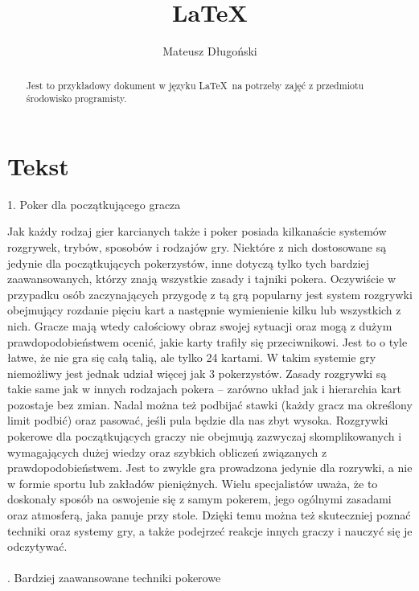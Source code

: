 \documentclass{article}
\title{\LaTeX}
\author{Mateusz Długoński}
\date{}
\begin{document}
\maketitle 

\begin{abstract}
Jest to przykładowy dokument w języku \LaTeX\ na potrzeby zajęć z przedmiotu środowisko programisty. 
\end{abstract}
\section{Tekst}\label{sec:tekst}
1. Poker dla początkującego gracza

Jak każdy rodzaj gier karcianych także i poker posiada kilkanaście systemów rozgrywek, trybów, sposobów i rodzajów gry. Niektóre z nich dostosowane są jedynie dla początkujących pokerzystów, inne dotyczą tylko tych bardziej zaawansowanych, którzy znają wszystkie zasady i tajniki pokera. Oczywiście w przypadku osób zaczynających przygodę z tą grą popularny jest system rozgrywki obejmujący rozdanie pięciu kart a następnie wymienienie kilku lub wszystkich z nich. Gracze mają wtedy całościowy obraz swojej sytuacji oraz mogą z dużym prawdopodobieństwem ocenić, jakie karty trafiły się przeciwnikowi. Jest to o tyle łatwe, że nie gra się całą talią, ale tylko 24 kartami.
W takim systemie gry niemożliwy jest jednak udział więcej jak 3 pokerzystów. Zasady rozgrywki są takie same jak w innych rodzajach pokera – zarówno układ jak i hierarchia kart pozostaje bez zmian. Nadal można też podbijać stawki (każdy gracz ma określony limit podbić) oraz pasować, jeśli pula będzie dla nas zbyt wysoka.
Rozgrywki pokerowe dla początkujących graczy nie obejmują zazwyczaj skomplikowanych i wymagających dużej wiedzy oraz szybkich obliczeń związanych z prawdopodobieństwem. Jest to zwykle gra prowadzona jedynie dla rozrywki, a nie w formie sportu lub zakładów pieniężnych. Wielu specjalistów uważa, że to doskonały sposób na oswojenie się z samym pokerem, jego ogólnymi zasadami oraz atmosferą, jaka panuje przy stole. Dzięki temu można też skuteczniej poznać techniki oraz systemy gry, a także podejrzeć reakcje innych graczy i nauczyć się je odczytywać.
\\
\\
. Bardziej zaawansowane techniki pokerowe
\end{document}
